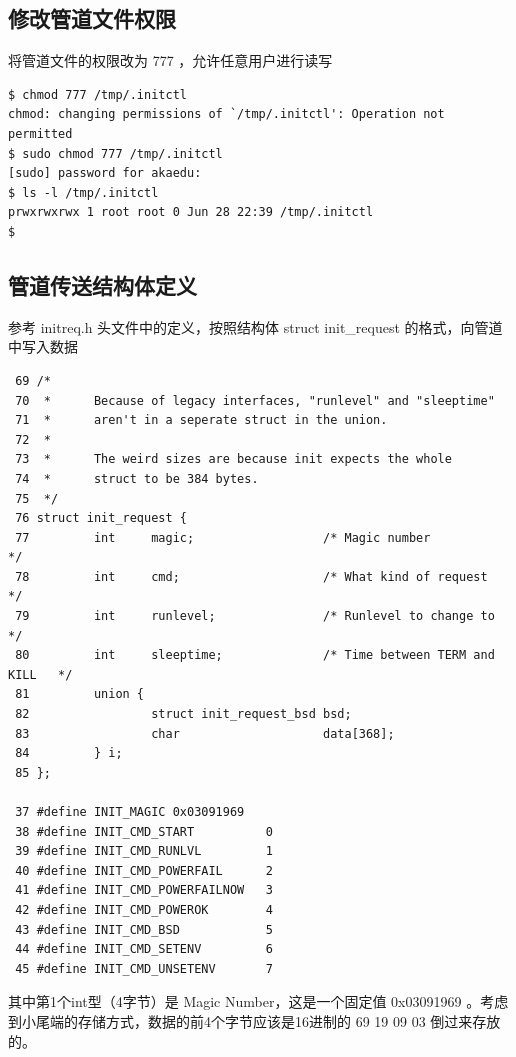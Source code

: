 \subsection{修改管道文件权限}

将管道文件的权限改为 777 ，允许任意用户进行读写

{\begin{shaded}\begin{verbatim}
$ chmod 777 /tmp/.initctl 
chmod: changing permissions of `/tmp/.initctl': Operation not permitted
$ sudo chmod 777 /tmp/.initctl 
[sudo] password for akaedu: 
$ ls -l /tmp/.initctl 
prwxrwxrwx 1 root root 0 Jun 28 22:39 /tmp/.initctl
$ 
\end{verbatim}\end{shaded}}
\subsection{管道传送结构体定义}

参考 initreq.h 头文件中的定义，按照结构体 struct init\_request
的格式，向管道中写入数据

{\begin{shaded}\begin{verbatim}
 69 /*
 70  *      Because of legacy interfaces, "runlevel" and "sleeptime"
 71  *      aren't in a seperate struct in the union.
 72  *
 73  *      The weird sizes are because init expects the whole
 74  *      struct to be 384 bytes.
 75  */
 76 struct init_request {
 77         int     magic;                  /* Magic number                 */
 78         int     cmd;                    /* What kind of request         */
 79         int     runlevel;               /* Runlevel to change to        */
 80         int     sleeptime;              /* Time between TERM and KILL   */
 81         union {
 82                 struct init_request_bsd bsd;
 83                 char                    data[368];
 84         } i;
 85 };

 37 #define INIT_MAGIC 0x03091969
 38 #define INIT_CMD_START          0
 39 #define INIT_CMD_RUNLVL         1
 40 #define INIT_CMD_POWERFAIL      2
 41 #define INIT_CMD_POWERFAILNOW   3
 42 #define INIT_CMD_POWEROK        4
 43 #define INIT_CMD_BSD            5
 44 #define INIT_CMD_SETENV         6
 45 #define INIT_CMD_UNSETENV       7
\end{verbatim}\end{shaded}}
其中第1个int型（4字节）是 Magic Number，这是一个固定值 0x03091969
。考虑到小尾端的存储方式，数据的前4个字节应该是16进制的 69 19 09 03
倒过来存放的。

